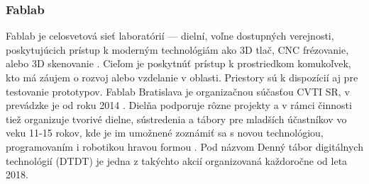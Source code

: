 \newpage
\subsubsection*{Fablab}
Fablab je celosvetová sieť laboratórií --- dielní, voľne dostupných verejnosti, poskytujúcich prístup k moderným technológiám ako 3D tlač, CNC frézovanie, alebo 3D skenovanie \cite{Fablab}. Cieľom je poskytnúť prístup k prostriedkom komukoľvek, kto má záujem o rozvoj alebo vzdelanie v oblasti. Priestory sú k dispozícií aj pre testovanie prototypov. Fablab Bratislava je organizačnou súčasťou CVTI SR, v prevádzke je od roku 2014 \cite{FablabVedeckyParkUK}. Dielňa podporuje rôzne projekty a v rámci činnosti tiež organizuje tvorivé dielne, sústredenia a tábory pre mladších účastníkov vo veku 11-15 rokov, kde je im umožnené zoznámiť sa s novou technológiou, programovaním i robotikou hravou formou \cite{FablabDTDT}. Pod názvom Denný tábor digitálnych technológií (DTDT) je jedna z takýchto akcií organizovaná každoročne od leta 2018.
